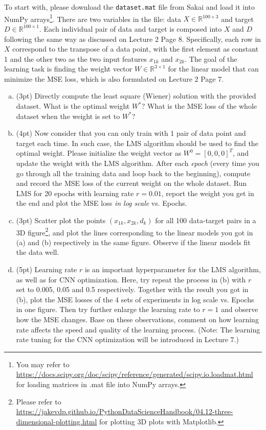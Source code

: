 \begin{assignment}[(15 pts)]
To start with, please download the \texttt{dataset.mat} file from Sakai and load it into NumPy arrays\footnote{You may refer to \url{https://docs.scipy.org/doc/scipy/reference/generated/scipy.io.loadmat.html} for loading matrices in .mat file into NumPy arrays.}. There are two variables in the file: data $X\in\mathbb{R}^{100\times3}$ and target $D\in\mathbb{R}^{100\times1}$. Each individual pair of data and target is composed into $X$ and $D$ following the same way as discussed on Lecture 2 Page 8. Specifically, each row in $X$ correspond to the transpose of a data point, with the first element as constant 1 and the other two as the two input features $x_{1k}$ and $x_{2k}$. The goal of the learning task is finding the weight vector $W\in\mathbb{R}^{3\times1}$ for the linear model that can minimize the MSE loss, which is also formulated on Lecture 2 Page 7.

\begin{enumerate}[(a)]
\item (3pt) Directly compute the least square (Wiener) solution with the provided dataset. What is the optimal weight $W^*$? What is the MSE loss of the whole dataset when the weight is set to $W^*$?
\item (4pt) Now consider that you can only train with 1 pair of data point and target each time. In such case, the LMS algorithm should be used to find the optimal weight. Please initialize the weight vector as $W^0 = [0,0,0]^T$, and update the weight with the LMS algorithm. After each \textit{epoch} (every time you go through all the training data and loop back to the beginning), compute and record the MSE loss of the current weight on the whole dataset. Run LMS for 20 epochs with learning rate $r=0.01$, report the weight you get in the end and plot the MSE loss \textit{in log scale} vs. Epochs.
\item (3pt) Scatter plot the points $(x_{1k}, x_{2k}, d_k)$ for all 100 data-target pairs in a 3D figure\footnote{Please refer to \url{https://jakevdp.github.io/PythonDataScienceHandbook/04.12-three-dimensional-plotting.html} for plotting 3D plots with Matplotlib.}, and plot the lines corresponding to the linear models you got in (a) and (b) respectively in the same figure. Observe if the linear models fit the data well.
\item (5pt) Learning rate $r$ is an important hyperparameter for the LMS algorithm, as well as for CNN optimization. Here, try repeat the process in (b) with $r$ set to 0.005, 0.05 and 0.5 respectively. Together with the result you got in (b), plot the MSE losses of the 4 sets of experiments in log scale vs. Epochs in one figure. Then try further enlarge the learning rate to $r=1$ and observe how the MSE changes. Base on these observations, comment on how learning rate affects the speed and quality of the learning process. (Note: The learning rate tuning for the CNN optimization will be introduced in Lecture 7.)
\end{enumerate}
\end{assignment}

